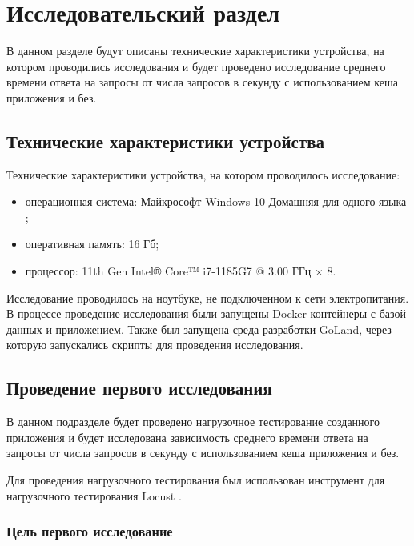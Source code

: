 \chapter{\label{research}Исследовательский раздел}

В данном разделе будут описаны технические характеристики устройства, на котором проводились исследования и будет проведено исследование среднего времени ответа на запросы от числа запросов в секунду с использованием кеша приложения и без.

\section{Технические характеристики устройства}

Технические характеристики устройства, на котором проводилось исследование: 

\begin{itemize}[label=--]
	\item операционная система: Майкрософт Windows 10 Домашняя для одного языка \cite{info_ms_windows_home};
	\item оперативная память: 16 Гб;
	\item процессор: 11th Gen Intel® Core™ i7-1185G7 @ 3.00 ГГц × 8.
\end{itemize}

Исследование проводилось на ноутбуке, не подключенном к сети электропитания. В процессе проведение исследования были запущены Docker-контейнеры с базой данных и приложением. Также был запущена среда разработки GoLand, через которую запускались скрипты для проведения исследования.

\section{Проведение первого исследования}

В данном подразделе будет проведено нагрузочное тестирование созданного приложения и будет исследована зависимость среднего времени ответа на запросы от числа запросов в секунду с использованием кеша приложения и без.

Для проведения нагрузочного тестирования был использован инструмент для нагрузочного тестирования Locust \cite{info_locust}.


\subsection{Цель первого исследование}

